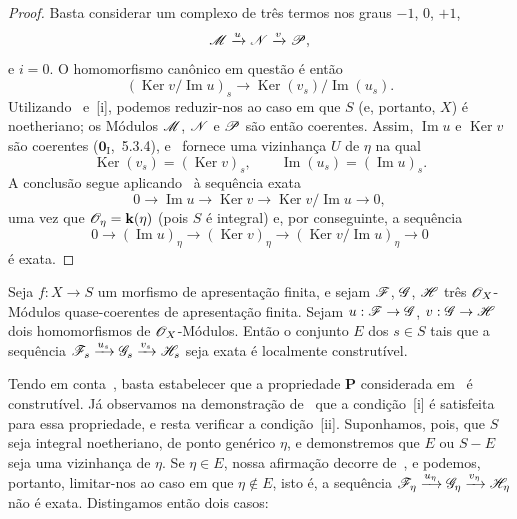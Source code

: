 
\begin{proof}
Basta considerar um complexo de três termos nos graus $-1$, $0$, $+1$,
\[
 \mathscr{M}\xrightarrow{u}\mathscr{N}\xrightarrow{v}\mathscr{P},
\]
e $i=0$.
O homomorfismo canônico em questão é então
\[
 (\operatorname{Ker}v/\operatorname{Im}u)_s
 \longrightarrow \operatorname{Ker}(v_s)/\operatorname{Im}(u_s).
\]
Utilizando~ e~[i], podemos reduzir-nos ao caso
em que $S$ (e, portanto, $X$) é noetheriano; os Módulos $\mathscr{M}$, $\mathscr{N}$ e
$\mathscr{P}$ são então coerentes.
Assim, $\operatorname{Im}u$ e $\operatorname{Ker}v$ são coerentes
($\mathbf{0}_{\mathrm{I}}$,~5.3.4), e~ fornece uma vizinhança
$U$ de $\eta$ na qual
\[
 \operatorname{Ker}(v_s)=(\operatorname{Ker}v)_s,
 \qquad
 \operatorname{Im}(u_s)=(\operatorname{Im}u)_s.
\]
A conclusão segue aplicando~ à sequência exata
\[
 0\longrightarrow\operatorname{Im}u\longrightarrow\operatorname{Ker}v
 \longrightarrow\operatorname{Ker}v/\operatorname{Im}u\longrightarrow0,
\]
uma vez que $\mathscr{O}_\eta=\mathbf{k}(\eta)$ (pois $S$ é integral) e, por conseguinte, a sequência
\[
 0\longrightarrow(\operatorname{Im}u)_\eta\longrightarrow(\operatorname{Ker}v)_\eta
 \longrightarrow(\operatorname{Ker}v/\operatorname{Im}u)_\eta\longrightarrow0
\]
é exata.
\end{proof}

\begin{proposition}[9.4.4]
\label{IV.9.4.4}
Seja $f:X\to S$ um morfismo de apresentação finita, e sejam $\mathscr{F}$, $\mathscr{G}$, $\mathscr{H}$ três $\mathscr{O}_X$-Módulos quase-coerentes de apresentação finita.
Sejam $u:\sh{F}\to\sh{G}$, $v:\sh{G}\to\sh{H}$ dois homomorfismos de $\mathscr{O}_X$-Módulos.
Então o conjunto $E$ dos $s\in S$ tais que a sequência $\mathscr{F}_s\xrightarrow{u_s}\mathscr{G}_s\xrightarrow{v_s}\mathscr{H}_s$ seja exata é localmente construtível.
\end{proposition}

Tendo em conta~, basta estabelecer que a propriedade $\mathbf{P}$ considerada em~ é construtível.
Já observamos na demonstração de~ que a condição~[i] é satisfeita para essa propriedade, e resta verificar a condição~[ii].
Suponhamos, pois, que $S$ seja integral noetheriano, de ponto genérico $\eta$, e demonstremos que $E$ ou $S-E$ seja uma vizinhança de $\eta$.
Se $\eta\in E$, nossa afirmação decorre de~, e podemos, portanto, limitar-nos ao caso em que $\eta\notin E$, isto é, a sequência $\mathscr{F}_\eta\xrightarrow{u_\eta}\mathscr{G}_\eta\xrightarrow{v_\eta}\mathscr{H}_\eta$ não é exata.
Distingamos então dois casos:

